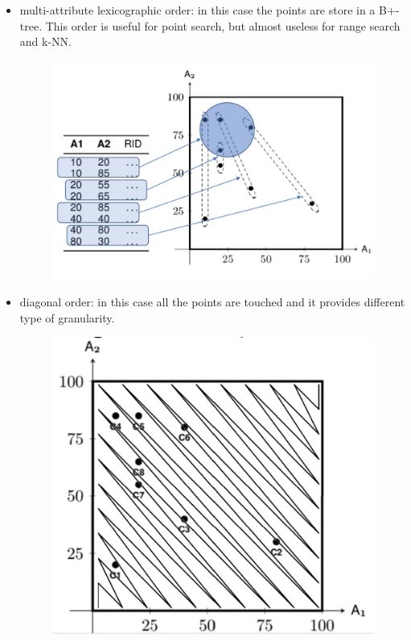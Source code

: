 \begin{itemize}
    \item multi-attribute lexicographic order: in this case the points are store in a B+-tree. This order is useful for point search, but almost useless for range search and k-NN.

    \begin{figure}[h!]
		\centering
		\includegraphics[scale = 0.8]{img/line1.jpg}
		\label{line1}
    \end{figure}

    \item diagonal order: in this case all the points are touched and it provides different type of granularity.

    \begin{figure}[H]
		\centering
		\includegraphics[scale = 0.7]{img/line2.jpg}
		\label{line2}
    \end{figure}


\end{itemize}
